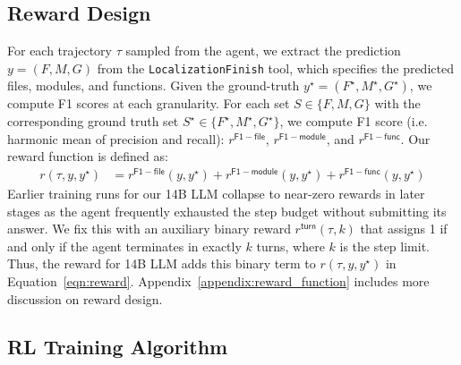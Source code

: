 \subsection{Reward Design}\label{sec:reward_design}
For each trajectory $\tau$ sampled from the agent, we extract the prediction $y = (F, M, G)$ from the \texttt{LocalizationFinish} tool, which specifies the predicted files, modules, and functions. Given the ground-truth $y^{\star} = (F^{\star}, M^{\star}, G^{\star})$, we compute F1 scores at each granularity. For each set $S \in \{F, M, G\}$ with the corresponding ground truth set $S^{\star} \in \{F^{\star}, M^{\star}, G^{\star}\}$, we compute F1 score (i.e. harmonic mean of precision and recall): $r^{\mathsf{F1-file}}$, $r^{\mathsf{F1-module}}$, and $r^{\mathsf{F1-func}}$. Our reward function is defined as:
\begin{equation}
\begin{aligned}
    r(\tau, y, y^{\star}) &= r^{\mathsf{F1-file}}(y, y^{\star}) + r^{\mathsf{F1-module}}(y, y^{\star}) + r^{\mathsf{F1-func}}(y, y^{\star})
\end{aligned}
\label{eqn:reward}
\end{equation}
Earlier training runs for our 14B LLM collapse to near-zero rewards in later stages as the agent frequently exhausted the step budget without submitting its answer. We fix this with an auxiliary binary reward $r^{\mathsf{turn}}(\tau, k)$ that assigns 1 if and only if the agent terminates in exactly $k$ turns, where $k$ is the step limit. Thus, the reward for 14B LLM adds this binary term to $r(\tau, y, y^{\star})$ in Equation~\ref{eqn:reward}. Appendix~\ref{appendix:reward_function} includes more discussion on reward design.

\subsection{RL Training Algorithm}\label{sec:train_algo}

